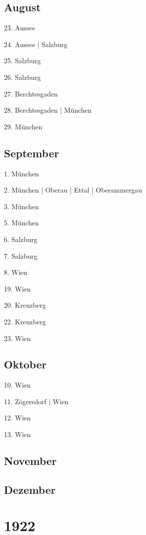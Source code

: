\documentclass[twoside=false,titlepage=false,open=any, parskip=never, fontsize=10pt, headings=small, chapterprefix=false, appendixprefix=false, DIV=15]{scrbook}
\begin{document}
\begin{multicols}{3}
            \section*{August}
            23. Aussee\par
            24. Aussee | Salzburg\par
            25. Salzburg\par
            26. Salzburg\par
            27. Berchtesgaden\par
            28. Berchtesgaden | München\par
            29. München\par
            \section*{September}
            1. München\par
            2. München | Oberau | Ettal | Oberammergau\par
            3. München\par
            5. München\par
            6. Salzburg\par
            7. Salzburg\par
            8. Wien\par
            19. Wien\par
            20. Kreuzberg\par
            22. Kreuzberg\par
            23. Wien\par
            \section*{Oktober}
            10. Wien\par
            11. Zögersdorf | Wien\par
            12. Wien\par
            13. Wien\par
            \section*{November}
            \section*{Dezember}
            \chapter*{1922}

\end{multicols}
\end{document}
